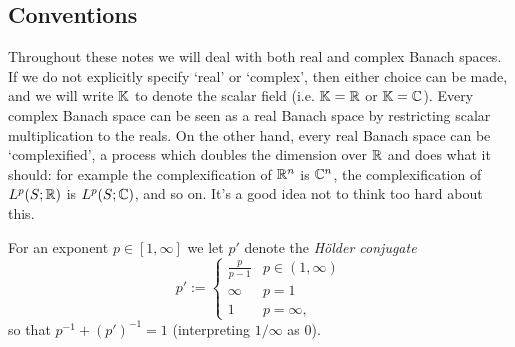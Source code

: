 \subsection{Conventions}\label{sec:conventions}
Throughout these notes we will deal with both real and complex Banach spaces.
If we do not explicitly specify `real' or `complex', then either choice can be made, and we will write $\mathbb{K}$ to denote the scalar field (i.e. $\mathbb{K} = \mathbb{R}$ or $\mathbb{K} = \mathbb{C}$).
Every complex Banach space can be seen as a real Banach space by restricting scalar multiplication to the reals.
On the other hand, every real Banach space can be `complexified', a process which doubles the dimension over $\mathbb{R}$ and does what it should: for example the complexification of $\mathbb{R}^n$ is $\mathbb{C}^n$, the complexification of $L^p(S;\mathbb{R})$ is $L^p(S;\mathbb{C})$, and so on.
It's a good idea not to think too hard about this.

For an exponent $p \in [1,\infty]$ we let $p'$ denote the \emph{H\"older conjugate}
\begin{equation*}
  p' := \begin{cases}
    \frac{p}{p-1} & p \in (1,\infty) \\
    \infty & p = 1 \\
    1 & p = \infty,
  \end{cases}
\end{equation*}
so that $p^{-1} + (p')^{-1} = 1$ (interpreting $1/\infty$ as $0$).







